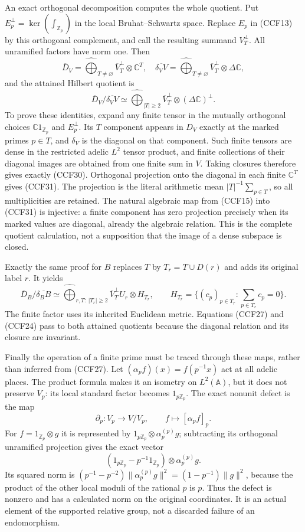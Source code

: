 \documentclass[11pt,a4paper]{article}
\theoremstyle{definition}\newtheorem{definition}[theorem]{Definition}
\begin{document}
An exact orthogonal decomposition computes the whole quotient.
Put $E_p^{\perp}=\ker(\int_{\mathbb Z_p})$ in the local
Bruhat--Schwartz space. Replace $E_p$ in (CCF13) by this
orthogonal complement, and call the resulting summand
$V_T^{\perp}$. All unramified factors have norm one. Then
\[
 \overline D_V=\widehat{\bigoplus}_{T\ne\varnothing}
                  \overline V_T^{\perp}\otimes\mathbb C^T,
 \quad
 \overline{\delta_VV}=\widehat{\bigoplus}_{T\ne\varnothing}
                  \overline V_T^{\perp}\otimes\Delta\mathbb C,
 \tag{CCF30}
\]
and the attained Hilbert quotient is
\[
 \overline D_V/\overline{\delta_VV}
   \simeq\widehat{\bigoplus}_{|T|\ge2}
      \overline V_T^{\perp}\otimes(\Delta\mathbb C)^{\perp}.
 \tag{CCF31}
\]
To prove these identities, expand any finite tensor in the
mutually orthogonal choices $\mathbb C1_{\mathbb Z_p}$ and
$E_p^\perp$. Its $T$ component appears in $D_V$ exactly at
the marked primes $p\in T$, and $\delta_V$ is the diagonal
on that component. Such finite tensors are dense in the
restricted adelic $L^2$ tensor product, and finite collections
of their diagonal images are obtained from one finite sum
in $V$. Taking closures therefore gives exactly (CCF30).
Orthogonal projection onto the diagonal in each finite
$\mathbb C^T$ gives (CCF31). The projection is the literal
arithmetic mean $|T|^{-1}\sum_{p\in T}$, so all multiplicities
are retained. The natural algebraic map from (CCF15) into
(CCF31) is injective: a finite component has zero projection
precisely when its marked values are diagonal, already the
algebraic relation. This is the complete quotient calculation,
not a supposition that the image of a dense subspace is closed.

Exactly the same proof for $B$ replaces $T$ by $T_r=T\cup D(r)$
and adds its original label $r$. It yields
\[
 \overline D_B/\overline{\delta_BB}
   \simeq\widehat{\bigoplus}_{r,T:\ |T_r|\ge2}
       \overline V_T^{\perp}U_r\otimes H_{T_r},\qquad
 H_{T_r}=\{(c_p)_{p\in T_r}:\sum_{p\in T_r}c_p=0\}.
 \tag{CCF32}
\]
The finite factor uses its inherited Euclidean metric. Equations
(CCF27) and (CCF24) pass to both attained quotients because
the diagonal relation and its closure are invariant.

Finally the operation of a finite prime must be traced through
these maps, rather than inferred from (CCF27). Let
$(\alpha_pf)(x)=f(p^{-1}x)$ act at all adelic places. The
product formula makes it an isometry on $L^2(\mathbb A)$,
but it does not preserve $V_p$: its local standard factor
becomes $1_{p\mathbb Z_p}$. The exact nonunit defect is the map
\[
 \partial_p:V_p\longrightarrow V/V_p,\qquad
      f\longmapsto[\alpha_pf]_p.
 \tag{CCF33}
\]
For $f=1_{\mathbb Z_p}\otimes g$ it is represented by
$1_{p\mathbb Z_p}\otimes\alpha_p^{(p)}g$; subtracting its
orthogonal unramified projection gives the exact vector
\[
 (1_{p\mathbb Z_p}-p^{-1}1_{\mathbb Z_p})
                  \otimes\alpha_p^{(p)}g.
 \tag{CCF34}
\]
Its squared norm is
$(p^{-1}-p^{-2})\|\alpha_p^{(p)}g\|^2
=(1-p^{-1})\|g\|^2$, because the product of the other local
moduli of the rational $p$ is $p$. Thus the defect is nonzero
and has a calculated norm on the original coordinates.
It is an actual element of the supported relative group,
not a discarded failure of an endomorphism.
\end{document}
